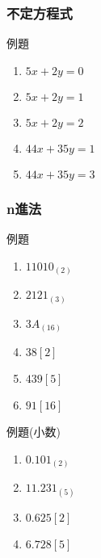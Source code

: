 \documentclass[10pt,dvipdfmx]{jsarticle}
\begin{document}
\subsubsection*{不定方程式}
\begin{itembox}[l]{例題}
  \begin{large}
    \begin{enumerate}
      \item $5x+2y=0$\vspace{5mm}
      \item $5x+2y=1$\vspace{5mm}
      \item $5x+2y=2$\vspace{5mm}
      \item $44x+35y=1$\vspace{5mm}
      \item $44x+35y=3$\vspace{5mm}
    \end{enumerate}
  \end{large}
\end{itembox}

\subsubsection*{n進法}
\begin{itembox}[l]{例題}
  \begin{multicols}{2}
    \begin{large}
      \begin{enumerate}
        \item $11010_{(2)}$
        \item $2121_{(3)}$
        \item $3A_{(16)}$
        \item $38 [2]$
        \item $439 [5]$
        \item $91 [16]$
      \end{enumerate}
    \end{large}
  \end{multicols}
\end{itembox}
\begin{itembox}[l]{例題(小数)}
  \begin{multicols}{2}
    \begin{large}
      \begin{enumerate}
        \item $0.101_{(2)}$
        \item $11.231_{(5)}$
        \item $0.625[2]$
        \item $6.728[5]$
      \end{enumerate}
    \end{large}
  \end{multicols}
\end{itembox}
\end{document}
